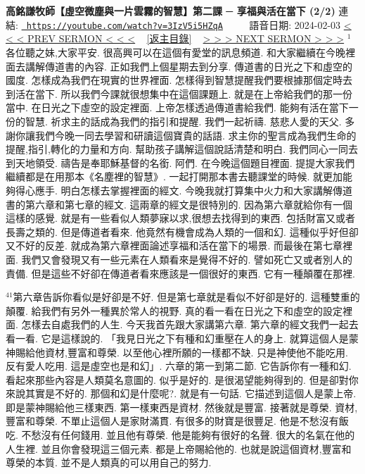 \documentclass{book}
\begin{document}
\section{}
\label{sec:3IzV5i5HZqA}
\textbf{高銘謙牧師【虛空微塵與一片雲霧的智慧】第二課 ─ 享福與活在當下 (2/2)}
\newline
\newline
連結: \href{https://youtube.com/watch?v=3IzV5i5HZqA}{\texttt{ https://youtube.com/watch?v=3IzV5i5HZqA}} ~~~~ 語音日期: 2024-02-03 
\newline
\newline
\hyperref[sec:XJPrqJx8e0Y]{\small{< < < PREV SERMON < < <}}
~
\hyperref[sec:index]{\small{[返主目錄]}}
~
\hyperref[sec:GvsPo_gDoyw]{\small{> > > NEXT SERMON > > >}}
\newline
\newline
$^{1}$各位聽之妹,大家平安.
很高興可以在這個有愛堂的訊息頻道.
和大家繼續在今晚裡面去講解傳道書的內容.
正如我們上個星期去到分享.
傳道書的日光之下和虛空的國度.
怎樣成為我們在現實的世界裡面.
怎樣得到智慧提醒我們要根據那個定時去到活在當下.
所以我們今課就很想集中在這個課題上.
就是在上帝給我們的那一份當中.
在日光之下虛空的設定裡面.
上帝怎樣透過傳道書給我們.
能夠有活在當下一份的智慧.
祈求主的話成為我們的指引和提醒.
我們一起祈禱.
慈悲人愛的天父.
多謝你讓我們今晚一同去學習和研讀這個寶貴的話語.
求主你的聖言成為我們生命的提醒,指引,轉化的力量和方向.
幫助孩子講解這個說話清楚和明白.
我們同心一同去到天地領受.
禱告是奉耶穌基督的名銜.
阿們.
在今晚這個題目裡面.
提提大家我們繼續都是在用那本《名塵裡的智慧》.
一起打開那本書去聽課堂的時候.
就更加能夠得心應手.
明白怎樣去掌握裡面的經文.
今晚我就打算集中火力和大家講解傳道書的第六章和第七章的經文.
這兩章的經文是很特別的.
因為第六章就給你有一個這樣的感覺.
就是有一些看似人類夢寐以求,很想去找得到的東西.
包括財富又或者長壽之類的.
但是傳道者看來.
他竟然有機會成為人類的一個和幻.
這種似乎好但卻又不好的反差.
就成為第六章裡面論述享福和活在當下的場景.
而最後在第七章裡面.
我們又會發現又有一些元素在人類看來是覺得不好的.
譬如死亡又或者別人的責備.
但是這些不好卻在傳道者看來應該是一個很好的東西.
它有一種顛覆在那裡.

$^{41}$第六章告訴你看似是好卻是不好.
但是第七章就是看似不好卻是好的.
這種雙重的顛覆.
給我們有另外一種異於常人的視野.
真的看一看在日光之下和虛空的設定裡面.
怎樣去自處我們的人生.
今天我首先跟大家講第六章.
第六章的經文我們一起去看一看.
它是這樣說的.
「我見日光之下有種和幻重壓在人的身上.
就算這個人是蒙神賜給他資材,豐富和尊榮.
以至他心裡所願的一樣都不缺.
只是神使他不能吃用.
反有愛人吃用.
這是虛空也是和幻」.
六章的第一到第二節.
它告訴你有一種和幻.
看起來那些內容是人類莫名意圖的.
似乎是好的.
是很渴望能夠得到的.
但是卻對你來說其實是不好的.
那個和幻是什麼呢?.
就是有一句話.
它描述到這個人是蒙上帝.
即是蒙神賜給他三樣東西.
第一樣東西是資材.
然後就是豐富.
接著就是尊榮.
資材,豐富和尊榮.
不單止這個人是家財滿貫.
有很多的財寶是很豐足.
他是不愁沒有飯吃.
不愁沒有任何錢用.
並且他有尊榮.
他是能夠有很好的名聲.
很大的名氣在他的人生裡.
並且你會發現這三個元素.
都是上帝賜給他的.
也就是說這個資材,豐富和尊榮的本質.
並不是人類真的可以用自己的努力.
\end{document}
